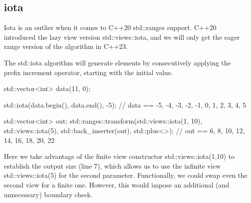 \subsection{iota}

Iota is an outlier when it comes to C++20 std::ranges support. C++20 introduced the lazy view version std::views::iota, and we will only get the eager range version of the algorithm in C++23.



The std::iota algorithm will generate elements by consecutively applying the prefix increment operator, starting with the initial value.

\begin{box-note}
\begin{cppcode}
std::vector<int> data(11, 0);

std::iota(data.begin(), data.end(), -5); 
// data == { -5, -4, -3, -2, -1, 0, 1, 2, 3, 4, 5 }

std::vector<int> out;
std::ranges::transform(std::views::iota(1, 10), std::views::iota(5), 
                       std::back_inserter(out), std::plus<>{});
// out == { 6, 8, 10, 12, 14, 16, 18, 20, 22 }
\end{cppcode}
\end{box-note}

Here we take advantage of the finite view constructor std::views::iota(1,10) to establish the output size (line 7), which allows us to use the infinite view std::views::iota(5) for the second parameter. Functionally, we could swap even the second view for a finite one. However, this would impose an additional (and unnecessary) boundary check.
